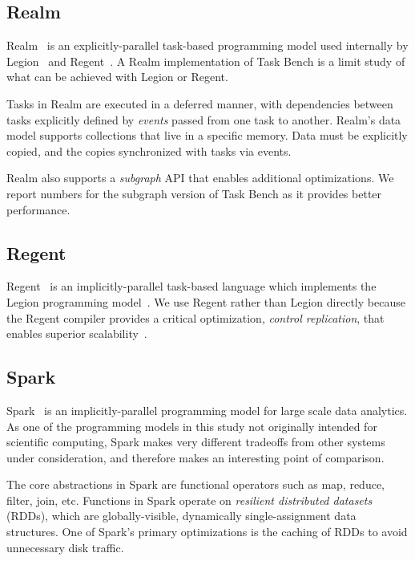 \subsection{Realm}

Realm~\cite{Realm14} is an explicitly-parallel task-based programming
model used internally by Legion~\cite{Legion12} and
Regent~\cite{Regent15}. A Realm implementation of Task Bench is a limit study of what can be achieved with Legion or Regent.

Tasks in Realm are executed in a deferred manner, with dependencies
between tasks explicitly defined by \emph{events} passed from one task
to another. Realm's data model supports collections that live in a
specific memory. Data must be explicitly copied, and the copies
synchronized with tasks via events.

Realm also supports a \emph{subgraph} API that enables additional
optimizations. We report numbers for the subgraph version of Task
Bench as it provides better performance.

\subsection{Regent}

Regent~\cite{Regent15} is an implicitly-parallel task-based language
which implements the Legion programming model~\cite{Legion12}. We use
Regent rather than Legion directly because the Regent compiler
provides a critical optimization, \emph{control replication}, that
enables superior scalability~\cite{ControlReplication17}.

\subsection{Spark}

Spark~\cite{Spark10} is an implicitly-parallel programming model for
large scale data analytics. As
one of the programming models in this study not originally intended
for scientific computing, Spark makes very different tradeoffs from
other systems under consideration, and therefore makes an interesting
point of comparison.

The core abstractions in Spark are functional operators such as map,
reduce, filter, join, etc. Functions in Spark operate on
\emph{resilient
  distributed datasets} (RDDs), which are globally-visible,
dynamically single-assignment data structures. One of Spark's primary
optimizations is the caching of RDDs to avoid unnecessary
disk traffic.

